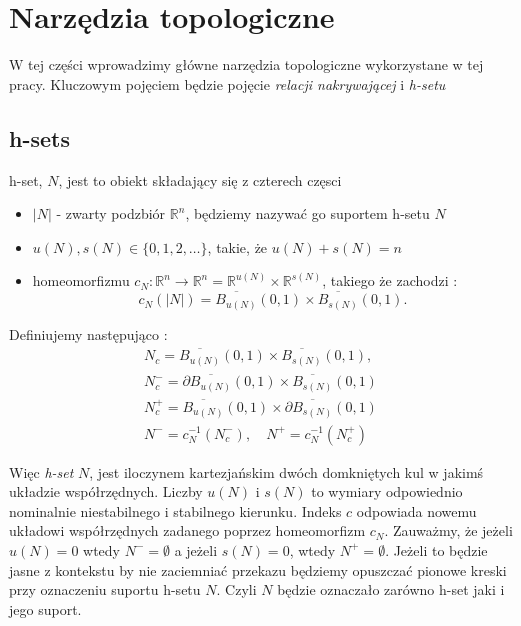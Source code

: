 
\section{Narzędzia topologiczne}
\label{sec:topmeth}

W tej części wprowadzimy główne narzędzia topologiczne wykorzystane w tej pracy.
Kluczowym pojęciem będzie pojęcie {\em relacji nakrywającej } i {\em h-setu} \cite{ZGi}

\subsection{h-sets}



\begin{definition} \cite{ZGi}
\label{def:covrel} h-set, $N$, jest to obiekt składający się z czterech
częsci
\begin{itemize}
 \item $|N|$  - zwarty podzbiór ${\mathbb R}^n$, będziemy nazywać go suportem h-setu $N$ %
 \item $u(N),s(N) \in \{0,1,2,\dots\}$, takie, że $u(N) + s(N) = n$ %
 \item homeomorfizmu $c_N:{\mathbb R}^n \to   
   {\mathbb R}^n={\mathbb R}^{u(N)} \times {\mathbb R}^{s(N)}$,
	 takiego że zachodzi : %
      \begin{displaymath}
        c_N(|N|)=\overline{B_{u(N)}}(0,1) \times
        \overline{B_{s(N)}}(0,1).
      \end{displaymath}
\end{itemize}
Definiujemy następująco : 
\begin{eqnarray*}
  N_c=\overline{B_{u(N)}}(0,1) \times \overline{B_{s(N)}}(0,1), \\
   N_c^-=\partial \overline{ B_{u(N)}}(0,1) \times
\overline{B_{s(N)}}(0,1) \\
N_c^+=\overline{B_{u(N)}}(0,1) \times
\partial \overline{B_{s(N)}}(0,1) \\
  N^-=c_N^{-1}(N_c^-) , \quad N^+=c_N^{-1}(N_c^+)
\end{eqnarray*}
\end{definition}

Więc {\em h-set }  $N$, jest iloczynem kartezjańskim dwóch domkniętych kul w jakimś
układzie współrzędnych. Liczby $u(N)$ i $s(N)$ to wymiary odpowiednio nominalnie niestabilnego
i stabilnego kierunku. Indeks $c$ odpowiada nowemu układowi współrzędnych zadanego poprzez homeomorfizm
$c_N$. Zauważmy, że jeżeli $u(N) = 0$ wtedy $N^-=\emptyset$ a jeżeli $s(N)=0$, wtedy $N^+=\emptyset$.
Jeżeli to będzie jasne z kontekstu by nie zaciemniać przekazu będziemy opuszczać pionowe kreski
przy oznaczeniu suportu h-setu $N$. Czyli $N$ będzie oznaczało zarówno h-set jaki i jego suport.

